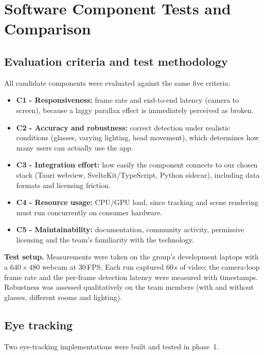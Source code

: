 \documentclass[11pt,a4paper]{article}
\begin{document}
\section{Software Component Tests and Comparison}
\label{sec:tests}

\subsection{Evaluation criteria and test methodology}

All candidate components were evaluated against the same five criteria:
\begin{itemize}[leftmargin=*,itemsep=1pt,topsep=2pt]
\item \textbf{C1 - Responsiveness:} frame rate and end-to-end latency
(camera to screen), because a laggy parallax effect is immediately
perceived as broken.
\item \textbf{C2 - Accuracy and robustness:} correct detection under
realistic conditions (glasses, varying lighting, head movement), which
determines how many users can actually use the app.
\item \textbf{C3 - Integration effort:} how easily the component connects
to our chosen stack (Tauri webview, SvelteKit/TypeScript, Python sidecar),
including data formats and licensing friction.
\item \textbf{C4 - Resource usage:} CPU/GPU load, since tracking and scene
rendering must run concurrently on consumer hardware.
\item \textbf{C5 - Maintainability:} documentation, community activity,
permissive licensing and the team's familiarity with the technology.
\end{itemize}

\noindent\textbf{Test setup.} Measurements were taken on the group's
development laptops with a $640\times480$ webcam at 30\,FPS. Each run captured
60\,s of video; the camera-loop frame rate and the per-frame detection latency
were measured with timestamps. Robustness was assessed qualitatively on the
team members (with and without glasses, different rooms and lighting).

\subsection{Eye tracking}

Two eye-tracking implementations were built and tested in phase~1.
\end{document}

